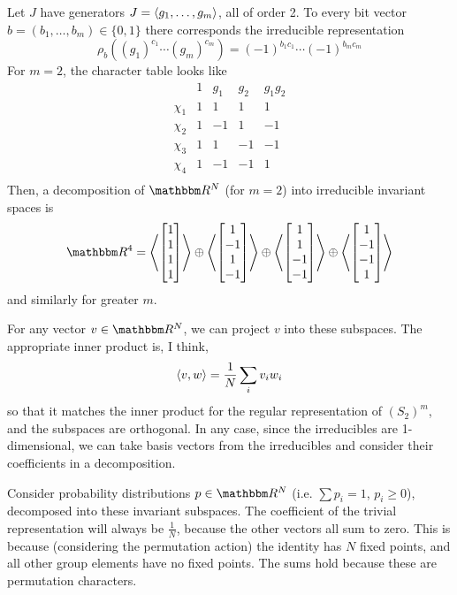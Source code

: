\documentclass[12pt]{article}
\begin{document}
Let $J$ have generators $J = \adel*{g_1, \ldots, g_m}$,
all of order 2.  To every bit vector $b = (b_1, \ldots, b_m) \in \{0, 1\}$ there
corresponds the irreducible representation
\[
    \rho_b((g_1)^{c_1 }\cdots (g_m)^{c_m}) = (-1)^{b_1 c_1} \cdots (-1)^{b_m c_m}
\]
For $m=2$, the character table looks like
\[
\begin{matrix}
    & 1 & g_1 & g_2 & g_1g_2 \\
    \chi_1 & 1 & 1 & 1 & 1 \\
    \chi_2 & 1 & -1 & 1 & -1 \\
    \chi_3 & 1 & 1 & -1 & -1 \\
    \chi_4 & 1 & -1 & -1 & 1 \\
\end{matrix}
\]
Then, a decomposition of $\R^N$ (for $m=2$) into irreducible invariant spaces is
\[
    \R^4 = 
    \adel*{\begin{bmatrix}1 \\ 1 \\ 1 \\ 1\end{bmatrix}}
    \oplus
    \adel*{\begin{bmatrix}1 \\ -1 \\ 1 \\ -1\end{bmatrix}}
    \oplus
    \adel*{\begin{bmatrix}1 \\ 1 \\ -1 \\ -1\end{bmatrix}}
    \oplus
    \adel*{\begin{bmatrix}1 \\ -1 \\ -1 \\ 1\end{bmatrix}}
\]
and similarly for greater $m$.

For any vector $v \in \R^N$, we can project $v$ into these subspaces.  The
appropriate inner product is, I think,
\[
    \adel*{v, w} = \frac 1 {N} \sum_i v_i w_i
\]
so that it matches the inner product for the regular representation of
$(S_2)^m$, and the subspaces are orthogonal.  In any case, since the
irreducibles are 1-dimensional, we can take basis vectors from the irreducibles
and consider their coefficients in a decomposition.

Consider probability distributions $p \in \R^N$ (i.e. $\sum p_i = 1$, $p_i \ge
0$), decomposed into these invariant subspaces.   The coefficient of the trivial
representation will always be $\tfrac 1 N$, because the other vectors all sum to
zero.  This is because (considering the permutation action) the identity has $N$
fixed points, and all other group elements have no fixed points.  The sums
hold because these are permutation characters.
\end{document}
